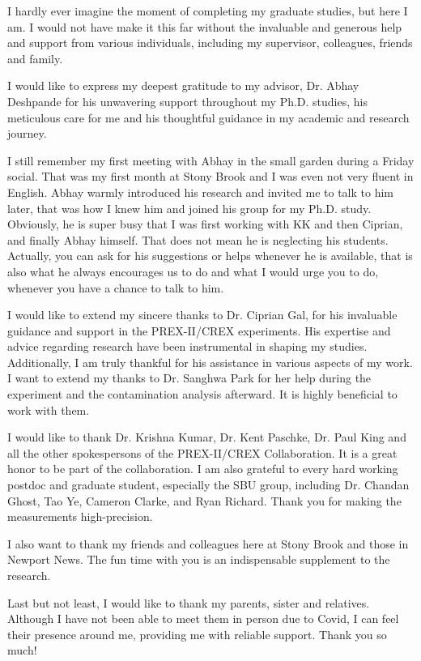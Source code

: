 I hardly ever imagine the moment of completing my graduate studies, but here I am. 
I would not have make it this far without the invaluable and generous help and support from various 
individuals, including my supervisor, colleagues, friends and family.

I would like to express my deepest gratitude to my advisor, Dr. Abhay Deshpande
for his unwavering support throughout my Ph.D. studies, his meticulous care for me 
and his thoughtful guidance in my academic and research journey.

I still remember my first meeting with Abhay in the small garden during a Friday social.
That was my first month at Stony Brook and I was even not very fluent in English.
Abhay warmly introduced his research and invited me to talk to him later, that 
was how I knew him and joined his group for my Ph.D. study. Obviously, he is super busy 
that I was first working with KK and then Ciprian, and finally Abhay himself. 
That does not mean he is neglecting his students. Actually, you can ask for 
his suggestions or helps whenever he is available, that is also what he always 
encourages us to do and what I would urge you to do, whenever you have a chance to talk to him.

I would like to extend my sincere thanks to Dr. Ciprian Gal, for his 
invaluable guidance and support in the PREX-II/CREX experiments. His expertise 
and advice regarding research have been instrumental in shaping my studies. 
Additionally, I am truly thankful for his assistance in various aspects of my work.
I want to extend my thanks to Dr. Sanghwa Park for her help during the experiment
and the contamination analysis afterward. It is highly beneficial to
work with them.

I would like to thank Dr. Krishna Kumar, Dr. Kent Paschke, Dr. Paul King
and all the other spokespersons of the PREX-II/CREX Collaboration. It is a great honor
to be part of the collaboration. I am also grateful to every hard working postdoc and
graduate student, especially the SBU group, including Dr. Chandan Ghost, Tao Ye, Cameron 
Clarke, and Ryan Richard. Thank you for making the measurements high-precision.

I also want to thank my friends and colleagues here at Stony Brook and those in Newport News. 
The fun time with you is an indispensable supplement to the research.

Last but not least, I would like to thank my parents, sister and relatives.
Although I have not been able to meet them in person due to Covid, 
I can feel their presence around me, 
providing me with reliable support. Thank you so much!
